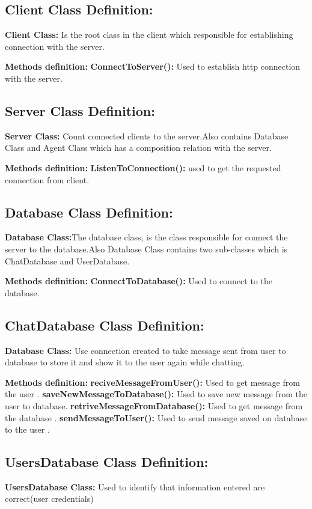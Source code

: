 \subsection{Client Class Definition:}
\textbf{Client Class:}  Is the root class in the client which responsible for establishing connection with the server.

\textbf{Methods definition:}
\textbf{ConnectToServer():}  Used to establish http connection with the server.



\subsection{Server Class Definition:}

\textbf{Server Class:}  Count connected clients to the server.Also contains Database Class and Agent Class which has a composition relation with the server. 

\textbf{Methods definition:}
\textbf{ListenToConnection():}  used to get the requested connection from client.

\subsection{Database Class Definition:}
\textbf{Database Class:}The database class, is the class responsible for connect the server to the database.Also Database Class contains two sub-classes which is ChatDatabase and UserDatabase.

\textbf{Methods definition:}
\textbf{ConnectToDatabase():} Used to connect to the database.

\subsection{ChatDatabase Class Definition:}
\textbf{Database Class:} Use connection created to take message sent from user to database to store it and show it to the user again while chatting.

\textbf{Methods definition:}
\textbf{reciveMessageFromUser():} Used to get message from the user .
\textbf{saveNewMessageToDatabase():} Used to save new  message from the user to database.
\textbf{retriveMessageFromDatabase():} Used to get message from the database .
\textbf{sendMessageToUser():} Used to send message saved on database to the user .

\subsection{UsersDatabase Class Definition:}
\textbf{UsersDatabase Class:} Used to identify that information entered are correct(user credentials)


